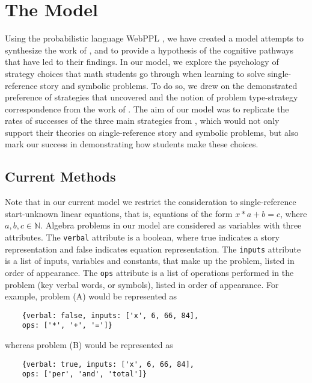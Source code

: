 \documentclass[10pt,letterpaper]{article}
\begin{document}
	
	\section{The Model}
	
	Using the probabilistic language WebPPL \cite{dippl}, we have created a model attempts to synthesize the work of ,  and  to provide a hypothesis of the cognitive pathways that have led to their findings. In our model, we explore the psychology of strategy choices that math students go through when learning to solve single-reference story and symbolic problems. To do so, we drew on the demonstrated preference of strategies that  uncovered and the notion of problem type-strategy correspondence from the work of . The aim of our model was to replicate the rates of successes of the three main strategies from \cite{KoedNath2004}, which would not only support their theories on single-reference story and symbolic problems, but also mark our success in demonstrating how students make these choices. 
	
	\subsection{Current Methods}
	
	Note that in our current model we restrict the consideration to single-reference start-unknown linear equations, that is, equations of the form $x*a+b=c$, where $a,b,c\in\mathbb{N}$. Algebra problems in our model are considered as variables with three attributes. The \verb|verbal| attribute is a boolean, where true indicates a story representation and false indicates equation representation. The \verb|inputs| attribute is a list of inputs, variables and constants, that make up the problem, listed in order of appearance. The \verb|ops| attribute is a list of operations performed in the problem (key verbal words, or symbols), listed in order of appearance.
	For example, problem (A) would be represented as 
	\begin{verbatim}
	{verbal: false, inputs: ['x', 6, 66, 84], 
	ops: ['*', '+', '=']}
	\end{verbatim}
	whereas problem (B) would be represented as
	\begin{verbatim}
	{verbal: true, inputs: ['x', 6, 66, 84], 
	ops: ['per', 'and', 'total']}
	\end{verbatim}
	
\end{document}
